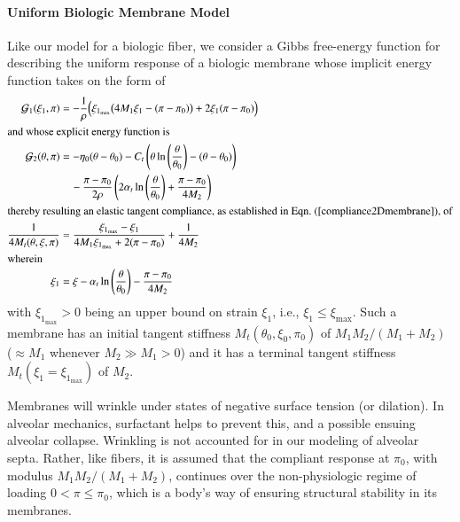 \paragraph{Uniform Biologic Membrane Model}

Like our model for a biologic fiber, we consider a Gibbs free-energy function for describing the uniform response of a biologic membrane whose implicit energy function takes on the form of
\begin{subequations} 
    \label{uniformMembrane}
    \begin{align}
    \mathcal{G}_1 (\xi_1 , \pi) & = - \frac{1}{\rho} 
    \Bigl( \xi_{1_{\max}} \bigl( 4M_1 \xi_1 - (\pi - \pi_0) \bigr) + 2 \xi_1 (\pi - \pi_0) \Bigr) \\
    \intertext{and whose explicit energy function is}
    \mathcal{G}_2 (\theta , \pi) & = 
    -\eta_0 ( \theta - \theta_0 )
    -C_t \left( \theta \ln \left( \frac{\theta}{\theta_0} \right) -
    (\theta - \theta_0) \right) \notag \\ 
    \mbox{} & \quad - \frac{\pi - \pi_0}{2\rho} \left( 
    2 \alpha_t \ln \left( \frac{\theta}{\theta_0} \right) + \frac{\pi - \pi_0}{4M_2} \right) \\
    \intertext{thereby resulting an elastic tangent compliance, as established in Eqn.~(\ref{compliance2Dmembrane}), of}
    \frac{1}{4M_t(\theta, \xi, \pi)} & = 
    \frac{\xi_{1_{\max}} - \xi_1}
    {4M_1 \xi_{1_{\max}} + 2 (\pi - \pi_0)} + \frac{1}{4M_2}
    \label{membraneCompliance} \\
    \intertext{wherein} 
    \xi_1 & = \xi - 
    \alpha_t \ln \left( \frac{\theta}{\theta_0} \right) - 
    \frac{\pi - \pi_0}{4M_2}
    \end{align}
\end{subequations}
with $\xi_{1_{\max}} > 0$ being an upper bound on strain $\xi_1$, i.e., $\xi_1 \leq \xi_{{\max}}$.  Such a membrane has an initial tangent stiffness $M_t(\theta_0, \xi_0, \pi_0)$ of $M_1 M_2 / ( M_1 + M_2 )$ ($\approx M_1$ whenever $M_2 \gg M_1 > 0$) and it has a terminal tangent stiffness $M_t(\xi_1 \! = \! \xi_{1_{\max}})$ of $M_2$.

Membranes will wrinkle under states of negative surface tension (or dilation).  In alveolar mechanics, surfactant helps to prevent this, and a possible ensuing alveolar collapse.  Wrinkling is not accounted for in our modeling of alveolar septa.  Rather, like fibers, it is assumed that the compliant response at $\pi_0$, with modulus $M_1 M_2 / ( M_1 + M_2 )$, continues over the non-physiologic regime of loading $0 < \pi \leq \pi_0$, which is a body's way of ensuring structural stability in its membranes.

